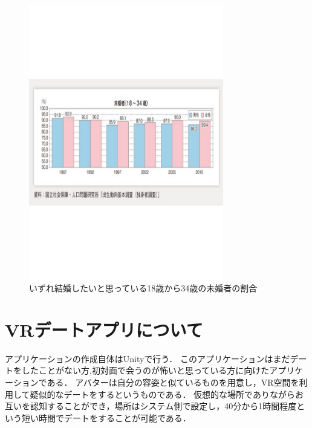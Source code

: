 \documentclass[12pt]{ltjsarticle}
\begin{document}
\begin{figure}[h]
\begin{center}
 \includegraphics[width=85mm]{fig1.pdf}
\end{center}
 \caption{いずれ結婚したいと思っている18歳から34歳の未婚者の割合}
 \label{fig:教科書}
\end{figure}

\section{VRデートアプリについて}
アプリケーションの作成自体はUnityで行う．
このアプリケーションはまだデートをしたことがない方,初対面で会うのが怖いと思っている方に向けたアプリケーションである．
アバターは自分の容姿と似ているものを用意し，VR空間を利用して疑似的なデートをするというものである．
仮想的な場所でありながらお互いを認知することができ，場所はシステム側で設定し，40分から1時間程度という短い時間でデートをすることが可能である．
\end{document}
